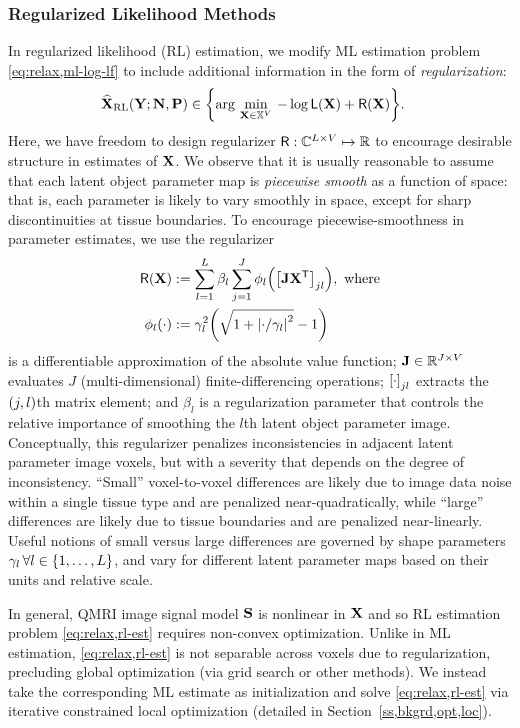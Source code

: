 \subsubsection{Regularized Likelihood Methods}
\label{sss,relax,meth,est,rls}

In regularized likelihood (RL) estimation,
we modify ML estimation problem \eqref{eq:relax,ml-log-lf}
to include additional information
in the form of \emph{regularization}:
\begin{align}
	\estaRL{\bmX}{\bmY; \bmN, \bmP} &\in
	\set{\argmin{\bmX \in \setX^V} -\log{\Lf{\bmX}} + \Rega{\bmX}}.
	\label{eq:relax,rl-est}
\end{align}
Here,
we have freedom to design regularizer 
$\mathsf{R} : \mathbb{C}^{L \times V} \mapsto \mathbb{R}$ 
to encourage desirable structure
in estimates of $\mathbf{X}$. 
We observe
that it is usually reasonable
to assume that each latent object parameter map
is \emph{piecewise smooth} as a function of space:
that is, 
each parameter is likely 
to vary smoothly in space,
except for sharp discontinuities 
at tissue boundaries.
To encourage piecewise-smoothness 
in parameter estimates,
we use the regularizer 
\begin{align}
	\Rega{\bmX} &:= \sum_{l=1}^L \beta_l \sum_{j=1}^J
	\phi_l\paren{\brac{\bmJ\bmX\tpose}_{jl}}, \where
	\label{eq:relax,reg} \\
	\phi_l\paren{\cdot} &:= 
	\gamma_l^2 \paren{\sqrt{1 + \abs{\cdot/\gamma_l}^2} - 1}
\end{align}
is a differentiable approximation
of the absolute value function;
$\mathbf{J} \in \mathbb{R}^{J\times V}$ 
evaluates $J$ (multi-dimensional) finite-differencing operations;
$\brac{\cdot}_{jl}$ extracts the $\paren{j,l}$th matrix element;
and $\beta_l$ is a regularization parameter
that controls the relative importance
of smoothing the $l$th latent object parameter image.
Conceptually,
this regularizer penalizes inconsistencies 
in adjacent latent parameter image voxels,
but with a severity that depends
on the degree of inconsistency. 
``Small'' voxel-to-voxel differences 
are likely due to image data noise
within a single tissue type
and are penalized near-quadratically, 
while ``large'' differences
are likely due to tissue boundaries
and are penalized near-linearly.
Useful notions 
of small versus large differences
are governed by shape parameters 
$\gamma_l\, \forall l\in\set{1,\dots,L}$,
and vary for different latent parameter maps
based on their units and relative scale.

In general, 
QMRI image signal model $\mathbf{S}$ is nonlinear in $\mathbf{X}$
and so RL estimation problem \eqref{eq:relax,rl-est}
requires non-convex optimization.
Unlike in ML estimation,
\eqref{eq:relax,rl-est} is not separable across voxels
due to regularization, 
precluding global optimization
(via grid search or other methods).
We instead take the corresponding ML estimate
as initialization
and solve \eqref{eq:relax,rl-est} 
via iterative constrained local optimization
(detailed in Section~\ref{ss,bkgrd,opt,loc}).

